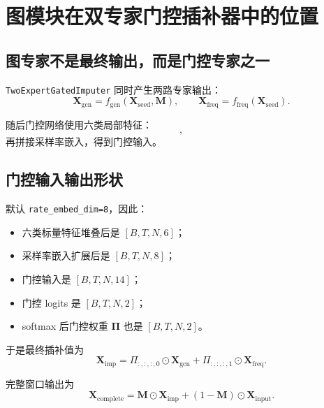 \documentclass[UTF8]{ctexart}
\begin{document}
\section{图模块在双专家门控插补器中的位置}

\subsection{图专家不是最终输出，而是门控专家之一}

\verb|TwoExpertGatedImputer| 同时产生两路专家输出：
\begin{equation}
    \bm{X}_{\text{gcn}} = f_{\text{gcn}}(\bm{X}_{\text{seed}}, \bm{M}),
    \qquad
    \bm{X}_{\text{freq}} = f_{\text{freq}}(\bm{X}_{\text{seed}}).
\end{equation}

随后门控网络使用六类局部特征：
\begin{equation}
    [\bm{X}_{\text{seed}},
    \bm{M},
    \bm{X}_{\text{gcn}},
    \bm{X}_{\text{freq}},
    \bm{X}_{\text{gcn}}-\bm{X}_{\text{seed}},
    \bm{X}_{\text{freq}}-\bm{X}_{\text{seed}}],
\end{equation}
再拼接采样率嵌入，得到门控输入。

\subsection{门控输入输出形状}

默认 \verb|rate_embed_dim=8|，因此：
\begin{itemize}
    \item 六类标量特征堆叠后是 \([B,T,N,6]\)；
    \item 采样率嵌入扩展后是 \([B,T,N,8]\)；
    \item 门控输入是 \([B,T,N,14]\)；
    \item 门控 logits 是 \([B,T,N,2]\)；
    \item softmax 后门控权重 \(\bm{\Pi}\) 也是 \([B,T,N,2]\)。
\end{itemize}

于是最终插补值为
\begin{equation}
    \bm{X}_{\text{imp}}
    =
    \Pi_{:,:,:,0} \odot \bm{X}_{\text{gcn}}
    +
    \Pi_{:,:,:,1} \odot \bm{X}_{\text{freq}}.
\end{equation}

完整窗口输出为
\begin{equation}
    \bm{X}_{\text{complete}}
    =
    \bm{M} \odot \bm{X}_{\text{imp}}
    +
    (1-\bm{M}) \odot \bm{X}_{\text{input}}.
\end{equation}
\end{document}
